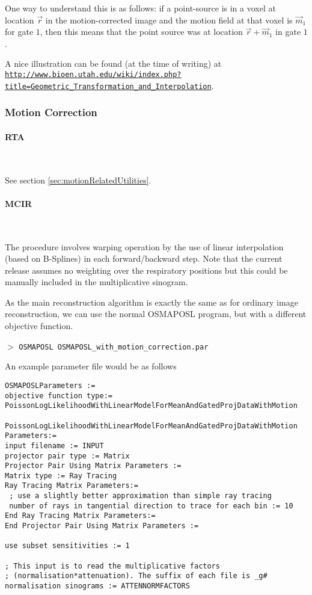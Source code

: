 \documentclass{article}
\def\url#1#2{\mbox{\href{#1}{\tt #2}}}
\newcommand{\subsubsubsection}[1]{\paragraph{#1}\mbox{} \\}
\newcommand{\cmdline}[1]{\par \noindent $>$ \texttt{#1}\par}
\begin{document}
{One way to understand this is as follows: if a point-source is in a voxel at location $\vec r$ in the motion-corrected image
and the motion field at that voxel is $\vec m_1$ for gate $1$, then this means that the point source
was at location $\vec r + \vec m_1$ in gate $1$.

A nice illustration can be found (at the time of writing) at\\ 
{ \small
\url{http://www.bioen.utah.edu/wiki/index.php?title=Geometric_Transformation_and_Interpolation}{http://www.bioen.utah.edu/wiki/index.php?title=Geometric\_Transformation\_and\_Interpolation}}.

\subsubsection{Motion Correction}

{ \subsubsubsection{RTA}
}
See section \ref{sec:motionRelatedUtilities}.

{ \subsubsubsection{MCIR}
}

The procedure involves warping operation by the use of linear interpolation (based
on B-Splines) in each forward/backward step. Note that the current release
assumes no weighting over the respiratory positions but this could be manually
included in the multiplicative sinogram.

As the main reconstruction algorithm is exactly the same as for ordinary image
reconstruction, we can use the normal OSMAPOSL program, but with a different
objective function. 

\cmdline{OSMAPOSL OSMAPOSL\_with\_motion\_correction.par}

An example parameter file would be as follows
{
\small
\begin{verbatim}
OSMAPOSLParameters :=
objective function type:= PoissonLogLikelihoodWithLinearModelForMeanAndGatedProjDataWithMotion

PoissonLogLikelihoodWithLinearModelForMeanAndGatedProjDataWithMotion Parameters:=
input filename := INPUT
projector pair type := Matrix
Projector Pair Using Matrix Parameters :=
Matrix type := Ray Tracing
Ray Tracing Matrix Parameters:=
 ; use a slightly better approximation than simple ray tracing
 number of rays in tangential direction to trace for each bin := 10
End Ray Tracing Matrix Parameters:=
End Projector Pair Using Matrix Parameters :=

use subset sensitivities := 1

; This input is to read the multiplicative factors
; (normalisation*attenuation). The suffix of each file is _g#
normalisation sinograms := ATTENNORMFACTORS


\end{verbatim}}}
\end{document}
